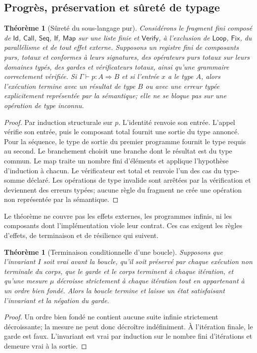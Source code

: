 \documentclass[11pt,a4paper]{article}
\theoremstyle{definition}
\theoremstyle{plain}
\newtheorem{theorem}[definition]{Théorème}
\theoremstyle{remark}
\begin{document}
\subsection{Progrès, préservation et sûreté de typage}
\begin{theorem}[Sûreté du sous-langage pur]
Considérons le fragment fini composé de $\mathsf{Id}$, $\mathsf{Call}$, $\mathsf{Seq}$, $\mathsf{If}$, $\mathsf{Map}$ sur une liste finie et $\mathsf{Verify}$, à l'exclusion de $\mathsf{Loop}$, $\mathsf{Fix}$, du parallélisme et de tout effet externe. Supposons un registre fini de composants purs, totaux et conformes à leurs signatures, des opérateurs purs totaux sur leurs domaines typés, des gardes et vérificateurs totaux, ainsi qu'une grammaire correctement vérifiée. Si $\Gamma\vdash p:A\Rightarrow B$ et si l'entrée $x$ a le type $A$, alors l'exécution termine avec un résultat de type $B$ ou avec une erreur typée explicitement représentée par la sémantique; elle ne se bloque pas sur une opération de type inconnu.
\end{theorem}
\begin{proof}
Par induction structurale sur $p$. L'identité renvoie son entrée. L'appel vérifie son entrée, puis le composant total fournit une sortie du type annoncé. Pour la séquence, le type de sortie du premier programme fournit le type requis au second. Le branchement choisit une branche dont le résultat est du type commun. Le map traite un nombre fini d'éléments et applique l'hypothèse d'induction à chacun. Le vérificateur est total et renvoie l'un des cas du type-somme déclaré. Les opérations de type invalide sont arrêtées par la vérification et deviennent des erreurs typées; aucune règle du fragment ne crée une opération non représentée par la sémantique.
\end{proof}
Le théorème ne couvre pas les effets externes, les programmes infinis, ni les composants dont l'implémentation viole leur contrat. Ces cas exigent les règles d'effets, de terminaison et de résilience qui suivent.

\begin{theorem}[Terminaison conditionnelle d'une boucle]
Supposons que l'invariant $I$ soit vrai avant la boucle, qu'il soit préservé par chaque exécution non terminale du corps, que le garde et le corps terminent à chaque itération, et qu'une mesure $\mu$ décroisse strictement à chaque itération tout en appartenant à un ordre bien fondé. Alors la boucle termine et laisse un état satisfaisant l'invariant et la négation du garde.
\end{theorem}
\begin{proof}
Un ordre bien fondé ne contient aucune suite infinie strictement décroissante; la mesure ne peut donc décroître indéfiniment. À l'itération finale, le garde est faux. L'invariant est vrai par induction sur le nombre fini d'itérations et demeure vrai à la sortie.
\end{proof}
\end{document}

